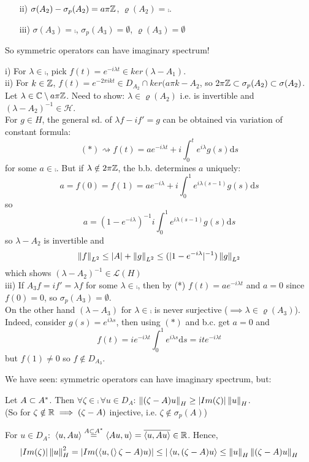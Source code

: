\begin{example}
\begin{itemize}
		\item [ii)] $\sigma(A_2)-\sigma_p(A_2)=a\pi\mathbb{Z}$, $\varrho(A_2)=\comp$.
		\item [iii)] $\sigma(A_3)=\comp$, $\sigma_p(A_3)=\emptyset$, $\varrho(A_3)=\emptyset$
	\end{itemize}
	So symmetric operators can have imaginary spectrum!
	\begin{pf}{}{}
		i) For $\lambda\in\comp$, pick $f(t)=e^{-i\lambda t}\in ker(\lambda-A_1)$.\\
		ii) For $k\in\mathbb{Z}$, $f(t)=e^{-2\pi ikt}\in D_{A_2}\cap ker(a\pi k-A_2$,
		so $2\pi \mathbb{Z}\subset \sigma_p(A_2)\subset\sigma(A_2)$.
		Let $\lambda\in\mathbb{C}\setminus a\pi\mathbb{Z}$.
		Need to show: $\lambda\in\varrho(A_2)$ i.e.  is invertible and $(\lambda-A_2)^{-1}\in\mathcal{H}$.\\
		For $g\in H$, the general sd. of $\lambda f-if'=g$ can be obtained via variation of constant formula:
		$$
			(*)\rightsquigarrow f(t)=ae^{-i\lambda t}+i \int_0^t e^{i\lambda}g(s)\mathrm{d}s
		$$
		for some $a\in\comp$. But if $\lambda\notin2\pi\mathbb{Z}$, the b.b. determines $a$ uniquely:
		$$
			a=f(0)=f(1)=ae^{-i\lambda}+i\int_0^1e^{i\lambda(s-1)}g(s)\mathrm{d}s$$
		so
		$$
			a=(1-e^{-i\lambda})^{-1}i\int_0^1e^{i\lambda(s-1)}g(s)\mathrm{d}s
		$$
		so $\lambda-A_2$ is invertible and
		$$
			\left\|{f}\right\|_{L^2}\leq |A|+\left\|{g}\right\|_{L^2}\leq(|1-e^{-i\lambda}|^{-1})\left\|{g}\right\|_{L^2}
		$$
		which shows $(\lambda-A_2)^{-1}\in\mathcal{L}(H)$\\
		iii) If $A_3f=if'=\lambda f$ for some $\lambda\in\comp$, then by (*) $f(t)=ae^{-i\lambda t}$ and $a=0$ since $f(0)=0$, so $\sigma_p(A_3)=\emptyset$.\\
		On the other hand $(\lambda-A_3)$ for $\lambda\in\comp$ is never surjective ($\implies \lambda\in\varrho(A_3)$). Indeed, consider $g(s)=e^{i\lambda s}$, then using $(*)$ and b.c. get $a=0$ and
		$$
			f(t)=ie^{-i\lambda t}\int_0^1e^{i\lambda s} \mathrm{d}s=ite^{-i\lambda t}
		$$
		but $f(1)\neq0$ so $f\notin D_{A_3}$.
	\end{pf}
\end{example}
We have seen: symmetric operators can have imaginary spectrum, but:
\begin{lemma}\nl
	Let $A\subset {A}^*$. Then $\forall\zeta\in\comp\,\forall u\in D_A$: $\left\|{(\zeta-A)u}\right\|_H\geq |Im(\zeta)|\left\|{u}\right\|_H$.\\
	(So for $\zeta\notin\mathbb{R}\implies(\zeta-A)$ injective, i.e. $\zeta\notin\sigma_p(A)$)
	\begin{pf}{}{}
		For $u\in D_A:$ $\left<{u},{Au}\right>\stackrel{A\subset{A}^*}{=}\left<{Au},{u}\right>=\overline{\left<{u},{Au}\right>}\in\mathbb{R}$. Hence,
		$$
			|Im(\zeta)|\left\|{u}\right\|^2_H=|Im(\left<{u},{(}\right>\zeta-A)u)|\leq|\left<{u},{(\zeta-A)u}\right>\leq\left\|{u}\right\|_H\left\|{(\zeta-A)u}\right\|_H
		$$
	\end{pf}
\end{lemma}
